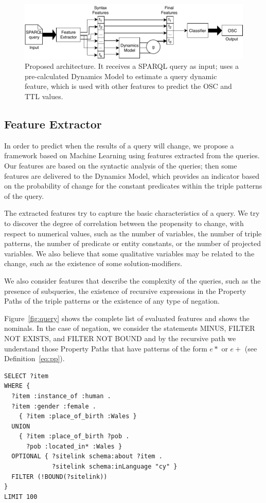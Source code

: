 \documentclass[runningheads]{llncs}
\begin{document}
\begin{figure}[!ht]
	\centering
	\includegraphics[width=0.7\linewidth]{img/schema.pdf}
	\caption{ Proposed architecture. It receives a SPARQL query as input; uses a pre-calculated Dynamics Model to estimate a query dynamic feature, which is used with other features to predict the OSC and TTL values. }
	\label{fig:schema}
\end{figure}

\subsection{Feature Extractor}

In order to predict when the results of a query will change, we propose a framework based on Machine Learning using features extracted from the queries. Our features are based on the syntactic analysis of the queries; then some features are delivered to the Dynamics Model, which provides an indicator based on the probability of change for the constant predicates within the triple patterns of the query.

The extracted features try to capture the basic characteristics of a query. We try to discover the degree of correlation between the propensity to change, with respect to numerical values, such as the number of variables, the number of triple patterns, the number of predicate or entity constants, or the number of projected variables. We also believe that some qualitative variables may be related to the change, such as the existence of some solution-modifiers.

We also consider features that describe the complexity of the queries, such as the presence of subqueries, the existence of recursive expressions in the Property Paths of the triple patterns or the existence of any type of negation.

Figure~\ref{fig:query} shows the complete list of evaluated features and shows the nominals. In the case of negation, we consider the statements MINUS, FILTER NOT EXISTS, and FILTER NOT BOUND and by the recursive path we understand those Property Paths that have patterns of the form $e*$ or $e+$ (see Definition~\ref{eq:pp}).

\begin{lstlisting}[captionpos=b, caption=Query example, label=fig:query,
basicstyle=\ttfamily,frame=single]
SELECT ?item
WHERE {
  ?item :instance_of :human .
  ?item :gender :female .
    { ?item :place_of_birth :Wales }
  UNION
    { ?item :place_of_birth ?pob .
      ?pob :located_in* :Wales }
  OPTIONAL { ?sitelink schema:about ?item .
             ?sitelink schema:inLanguage "cy" }
  FILTER (!BOUND(?sitelink))
}
LIMIT 100
\end{lstlisting}
\end{document}
